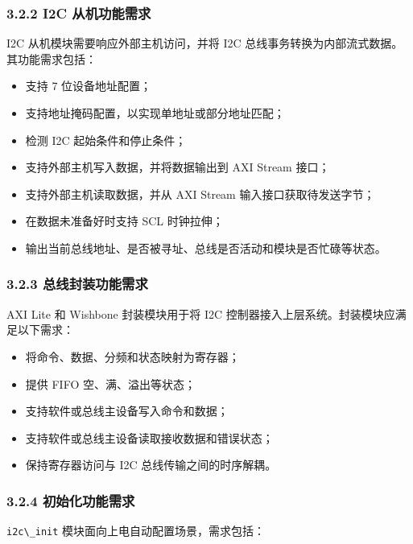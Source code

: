 \subsubsection{3.2.2 I2C
从机功能需求}\label{i2c-ux4eceux673aux529fux80fdux9700ux6c42}

I2C 从机模块需要响应外部主机访问，并将 I2C
总线事务转换为内部流式数据。其功能需求包括：

\begin{itemize}
\tightlist
\item
  支持 7 位设备地址配置；
\item
  支持地址掩码配置，以实现单地址或部分地址匹配；
\item
  检测 I2C 起始条件和停止条件；
\item
  支持外部主机写入数据，并将数据输出到 AXI Stream 接口；
\item
  支持外部主机读取数据，并从 AXI Stream 输入接口获取待发送字节；
\item
  在数据未准备好时支持 SCL 时钟拉伸；
\item
  输出当前总线地址、是否被寻址、总线是否活动和模块是否忙碌等状态。
\end{itemize}

\subsubsection{3.2.3
总线封装功能需求}\label{ux603bux7ebfux5c01ux88c5ux529fux80fdux9700ux6c42}

AXI Lite 和 Wishbone 封装模块用于将 I2C
控制器接入上层系统。封装模块应满足以下需求：

\begin{itemize}
\tightlist
\item
  将命令、数据、分频和状态映射为寄存器；
\item
  提供 FIFO 空、满、溢出等状态；
\item
  支持软件或总线主设备写入命令和数据；
\item
  支持软件或总线主设备读取接收数据和错误状态；
\item
  保持寄存器访问与 I2C 总线传输之间的时序解耦。
\end{itemize}

\subsubsection{3.2.4
初始化功能需求}\label{ux521dux59cbux5316ux529fux80fdux9700ux6c42}

\passthrough{\lstinline!i2c\_init!} 模块面向上电自动配置场景，需求包括：

